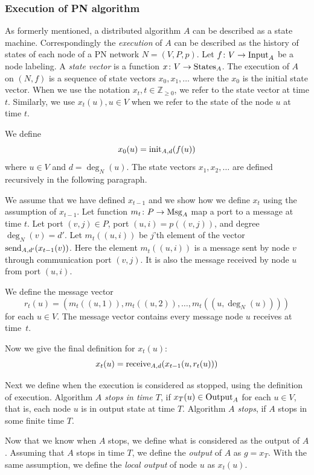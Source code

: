 \subsubsection{Execution of PN algorithm}

As formerly mentioned, a distributed algorithm $A$ can be described as a state machine.
Correspondingly the \emph{execution} of $A$ can be described as the history of states of each node of a PN network $N=(V, P, p)$.
Let $f\colon V \rightarrow \operatorname{Input}_A$ be a node labeling.
A \emph{state vector} is a function $x\colon V \rightarrow \operatorname{States}_A$.
The execution of $A$ on $(N, f)$ is a sequence of state vectors $x_0, x_1, \dotsc$ where the $x_0$ is the initial state vector.
When we use the notation $x_t, t \in \mathbb{Z}_{\geq 0}$, we refer to the state vector at time $t$.
Similarly, we use $x_t(u), u \in V$ when we refer to the state of the node $u$ at time $t$.

We define $$x_0(u) = \operatorname{init}_{A,d}(f(u))$$ where $u\in V$ and $d=\deg_N(u)$.
The state vectors $x_1, x_2, \dotsc$ are defined recursively in the following paragraph.

We assume that we have defined $x_{t-1}$ and we show how we define $x_{t}$ using the assumption of $x_{t-1}$.
Let function $m_t\colon P \rightarrow \operatorname{Msg}_A$ map a port to a message at time $t$.
Let port $(v, j) \in P$, port $(u, i) = p((v, j))$, and degree $\deg_N(v) = d'$.
Let $m_t((u, i))$ be $j$'th element of the vector $\operatorname{send}_{A, d'}(x_{t-1}(v))$.
Here the element $m_t((u, i))$ is a message sent by node $v$ through communication port $(v, j)$.
It is also the message received by node $u$ from port $(u, i)$.

We define the message vector $$r_t(u)=(m_t((u, 1)), m_t((u, 2)), \dotsc, m_t((u, \deg_N(u))))$$ for each $u\in V$.
The message vector contains every message node $u$ receives at time~$t$.

Now we give the final definition for $x_t(u)$:
$$x_t(u) = \operatorname{receive}_{A,d}(x_{t-1}(u, r_t(u)))$$

Next we define when the execution is considered as stopped, using the definition of execution.
Algorithm \emph{$A$ stops in time $T$}, if $x_T(u) \in \operatorname{Output}_A$ for each $u \in V$, that is, each node $u$ is in output state at time $T$.
Algorithm \emph{$A$ stops}, if $A$ stops in some finite time $T$.


Now that we know when $A$ stops, we define what is considered as the output of $A$.
Assuming that $A$ stops in time $T$, we define the \emph{output} of $A$ as $g=x_T$.
With the same assumption, we define the \emph{local output} of node $u$ as $x_t(u)$.



